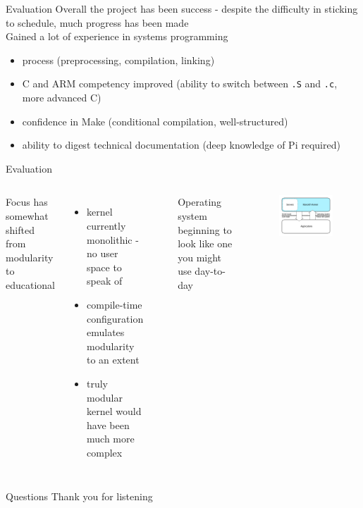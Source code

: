 \documentclass[10pt]{beamer}
\newcommand{\code}[1]{\texttt{#1}}
\begin{document}
\begin{frame}{Evaluation}
    Overall the project has been success - despite the difficulty in sticking to schedule, much progress has been made \\

    Gained a lot of experience in systems programming
    \begin{itemize}
        \item process (preprocessing, compilation, linking)
        \item C and ARM competency improved (ability to switch between \code{.S} and \code{.c}, more advanced C)
        \item confidence in Make (conditional compilation, well-structured)
        \item ability to digest technical documentation (deep knowledge of Pi required)
    \end{itemize}
\end{frame}

\begin{frame}{Evaluation}
    \begin{columns}
        Focus has somewhat shifted from modularity to educational
        \begin{itemize}
            \item kernel currently monolithic - no user space to speak of
            \item compile-time configuration emulates modularity to an extent
            \item truly modular kernel would have been much more complex
        \end{itemize} ~

        Operating system beginning to look like one you might use day-to-day \\

        \begin{figure}
            \centering
            \includegraphics[width=.9\textwidth]{monolithic.png}
        \end{figure}
    \end{columns}

\end{frame}

\begin{frame}{Questions}
    \centering
    Thank you for listening
\end{frame}
\end{document}
